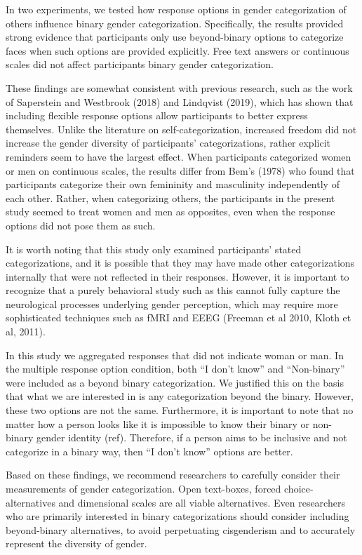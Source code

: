 \documentclass[
  man]{apa7}
\begin{document}
In two experiments, we tested how response options in gender categorization of others influence binary gender categorization. Specifically, the results provided strong evidence that participants only use beyond-binary options to categorize faces when such options are provided explicitly. Free text answers or continuous scales did not affect participants binary gender categorization.

These findings are somewhat consistent with previous research, such as the work of Saperstein and Westbrook (2018) and Lindqvist (2019), which has shown that including flexible response options allow participants to better express themselves. Unlike the literature on self-categorization, increased freedom did not increase the gender diversity of participants' categorizations, rather explicit reminders seem to have the largest effect. When participants categorized women or men on continuous scales, the results differ from Bem's (1978) who found that participants categorize their own femininity and masculinity independently of each other. Rather, when categorizing others, the participants in the present study seemed to treat women and men as opposites, even when the response options did not pose them as such.

It is worth noting that this study only examined participants' stated categorizations, and it is possible that they may have made other categorizations internally that were not reflected in their responses. However, it is important to recognize that a purely behavioral study such as this cannot fully capture the neurological processes underlying gender perception, which may require more sophisticated techniques such as fMRI and EEEG (Freeman et al 2010, Kloth et al, 2011).

In this study we aggregated responses that did not indicate woman or man. In the multiple response option condition, both ``I don't know'' and ``Non-binary'' were included as a beyond binary categorization. We justified this on the basis that what we are interested in is any categorization beyond the binary. However, these two options are not the same. Furthermore, it is important to note that no matter how a person looks like it is impossible to know their binary or non-binary gender identity (ref). Therefore, if a person aims to be inclusive and not categorize in a binary way, then ``I don't know'' options are better.

Based on these findings, we recommend researchers to carefully consider their measurements of gender categorization. Open text-boxes, forced choice-alternatives and dimensional scales are all viable alternatives. Even researchers who are primarily interested in binary categorizations should consider including beyond-binary alternatives, to avoid perpetuating cisgenderism and to accurately represent the diversity of gender.
\end{document}
